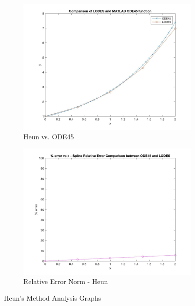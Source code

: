 \documentclass[12pt, titlepage]{article}
\begin{document}
\begin{figure}[H]
\centering
\begin{subfigure}{.55\textwidth}
  \centering
  \includegraphics[width=\linewidth]{images/Test2/3LODESvsMATLABPlot.jpg}
  \caption{Heun vs. ODE45}
  \label{fig:heun2a}
\end{subfigure}%
\begin{subfigure}{.55\textwidth}
  \centering
  \includegraphics[width=\linewidth]{images/Test2/3RelativeErrorPlot.jpg}
  \caption{Relative Error Norm - Heun}
  \label{fig:heun2b}
\end{subfigure}
\caption{Heun's Method Analysis Graphs}
\label{fig:heun2}
\end{figure}
\end{document}
